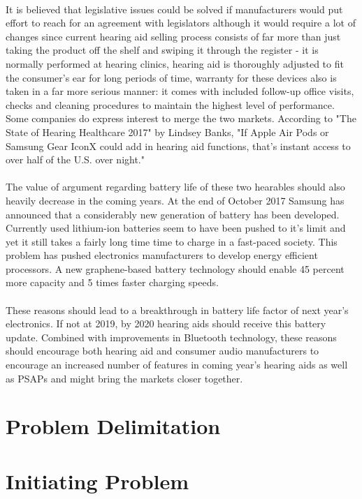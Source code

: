 \paragraph{}
It is believed that legislative issues could be solved if manufacturers would put effort to reach for an agreement with legislators although it would require a lot of changes since current hearing aid selling process consists of far more than just taking the product off the shelf and swiping it through the register - it is normally performed at hearing clinics, hearing aid is thoroughly adjusted to fit the consumer's ear for long periods of time, warranty for these devices also is taken in a far more serious manner: it comes with included follow-up office visits, checks and cleaning procedures to maintain the highest level of performance. Some companies do express interest to merge the two markets. According to "The State of Hearing Healthcare 2017" by Lindsey Banks, "If Apple Air Pods or Samsung Gear IconX could add in hearing aid functions, that’s instant access to over half of the U.S. over night."  
\paragraph{}
The value of argument regarding battery life of these two hearables should also heavily decrease in the coming years. At the end of October 2017 Samsung has announced that a considerably new generation of battery has been developed. Currently used lithium-ion batteries seem to have been pushed to it's limit  and yet it still takes a fairly long time time to charge in a fast-paced society. This problem has pushed electronics manufacturers to develop energy efficient processors. A new graphene-based battery technology should enable 45 percent more capacity and 5 times faster charging speeds.
\paragraph{}
These reasons should lead to a breakthrough in battery life factor of next year's electronics. If not at 2019, by 2020 hearing aids should receive this battery update. Combined with improvements in Bluetooth technology, these reasons should encourage both hearing aid and consumer audio manufacturers to encourage an increased number of features in coming year's hearing aids as well as PSAPs and might bring the markets closer together. 
   
\section{Problem Delimitation}
\section{Initiating Problem}


